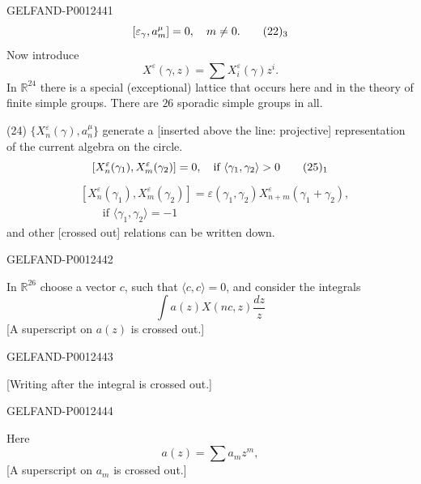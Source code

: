 \begin{GelfandAdjacentEvidence}{GELFAND-P001244}{1}
\begin{equation*}
\relax [\varepsilon_\gamma,a_m^\mu]=0,\quad m\ne0.\tag*{$(22)_3$}
\end{equation*}
Now introduce
\begin{equation*}
X^\varepsilon(\gamma,z)=\sum X_i^\varepsilon(\gamma)z^i.\tag{23}
\end{equation*}
In $\mathbb R^{24}$ there is a special (exceptional) lattice that occurs here and in the theory of finite simple groups.
There are $26$ sporadic simple groups in all.

(24) $\{X_n^\varepsilon(\gamma),a_n^\mu\}$ generate a [inserted above the line: projective] representation of the current algebra on the circle.
\begin{equation*}
\relax [X_n^\varepsilon(\gamma_1),X_m^\varepsilon(\gamma_2)]=0,
\quad\text{if }\langle\gamma_1,\gamma_2\rangle>0\tag*{$(25)_1$}
\end{equation*}
\begin{equation*}
\begin{aligned}
&[X_n^\varepsilon(\gamma_1),X_m^\varepsilon(\gamma_2)]
=\varepsilon(\gamma_1,\gamma_2)X_{n+m}^\varepsilon(\gamma_1+\gamma_2),\\
&\qquad\text{if }\langle\gamma_1,\gamma_2\rangle=-1
\end{aligned}
\tag*{$(25)_2$}
\end{equation*}
and other [crossed out] relations can be written down.
\end{GelfandAdjacentEvidence}
\begin{GelfandAdjacentEvidence}{GELFAND-P001244}{2}


In $\mathbb R^{26}$ choose a vector $c$, such that $\langle c,c\rangle=0$, and consider the integrals
\begin{equation*}
\int a(z)X(nc,z)\frac{dz}{z}\tag{26}
\end{equation*}
[A superscript on $a(z)$ is crossed out.]
\end{GelfandAdjacentEvidence}
\begin{GelfandAdjacentEvidence}{GELFAND-P001244}{3}

[Writing after the integral is crossed out.]
\end{GelfandAdjacentEvidence}
\begin{GelfandAdjacentEvidence}{GELFAND-P001244}{4}


Here
\begin{equation*}
a(z)=\sum a_m z^m,\tag{27}
\end{equation*}
[A superscript on $a_m$ is crossed out.]
\end{GelfandAdjacentEvidence}

